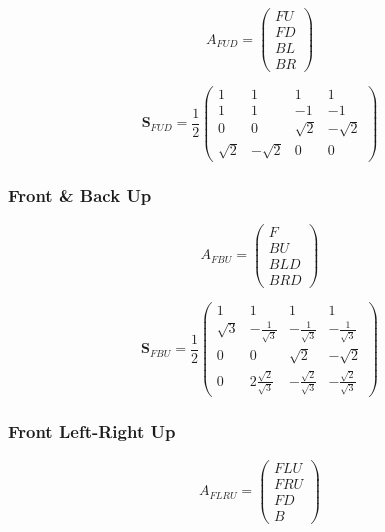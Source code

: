 \documentclass[12pt]{article}
\begin{document}
\begin{equation}	\label{eq:afud_sig}
A_{FUD} = \begin{pmatrix}
	FU\\
	FD\\
	BL\\
	BR
\end{pmatrix}
\end{equation}

\begin{equation}	\label{eq:ab_fud}
\mathbf{S}_{FUD} = \frac{1}{2} \begin{pmatrix}
	1 & 1 & 1 & 1\\
	1 & 1 & -1 & -1\\
	0 & 0 & \sqrt{2} & -\sqrt{2}\\
	\sqrt{2} & -\sqrt{2} & 0 & 0
\end{pmatrix}
\end{equation}

\subsubsection{Front \& Back Up}

\begin{equation}	\label{eq:afbu_sig}
A_{FBU} = \begin{pmatrix}
	F\\
	BU\\
	BLD\\
	BRD
\end{pmatrix}
\end{equation}


\begin{equation}	\label{eq:ab_fbu}
\mathbf{S}_{FBU} = \frac{1}{2} \begin{pmatrix}
	1 & 1 & 1 & 1\\
	\sqrt{3} & -\frac{1}{\sqrt{3}} & -\frac{1}{\sqrt{3}} & -\frac{1}{\sqrt{3}}\\
	0 & 0 & \sqrt{2} & -\sqrt{2}\\
	0 & 2\frac{\sqrt{2}}{\sqrt{3}} & -\frac{\sqrt{2}}{\sqrt{3}} & -\frac{\sqrt{2}}{\sqrt{3}}
\end{pmatrix}
\end{equation}

\subsubsection{Front Left-Right Up}

\begin{equation}	\label{eq:aflru_sig}
A_{FLRU} = \begin{pmatrix}
	FLU\\
	FRU\\
	FD\\
	B
\end{pmatrix}
\end{equation}
\end{document}
